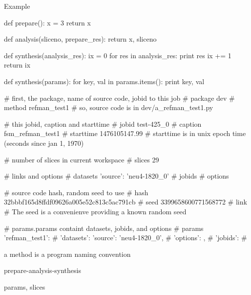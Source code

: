 Example

\begin{python}
def prepare():
  x = 3
  return x

def analysis(sliceno, prepare_res):
  return x, sliceno
  
def synthesis(analysis_res):
  ix = 0
  for res in analysis_res:
    print res
    ix += 1
  return ix
\end{python}

\begin{python}
def synthesis(params):
  for key, val in params.items():
    print key, val

# first, the package, name of source code, jobid to this job
#   package   dev
#   method    refman_test1
# so, source code is in dev/a_refman_test1.py

# this jobid, caption and starttime
#   jobid     test-425_0
#   caption   fsm_refman_test1
#   starttime 1476105147.99
# starttime is in unix epoch time (seconds since jan 1, 1970)
    
# number of slices in current workspace
#   slices    29

# links and options
#   datasets  {'source': 'neu4-1820_0'}
#   jobids    {}
#   options   {}

# source code hash, random seed to use    
#   hash      32bbbf165d8ffdf09626a005e52c813c5ac791cb
#   seed      3399658600771568772
#   link      {}
# The seed is a convenienve providing a known random seed

# params.params containt datasets, jobids, and options
#   params    {'refman_test1': {
#                'datasets': {'source': 'neu4-1820_0'},
#                'options': {},
#                'jobids': {}}
#             }
\end{python}

a method is a program
naming convention

prepare-analysis-synthesis

params, slices
